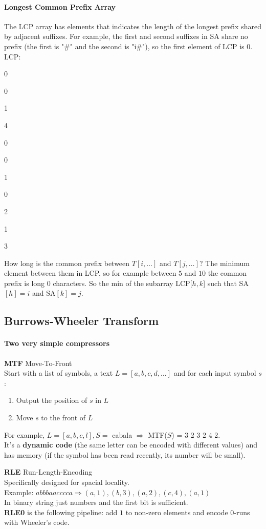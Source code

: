 \documentclass[10pt]{report}
\begin{document}
\paragraph{Longest Common Prefix Array} The LCP array has elements that indicates the length of the longest prefix shared by adjacent suffixes. For example, the first and second suffixes in SA share no prefix (the first is "\#" and the second is "i\#"), so the first element of LCP is 0. LCP:
\begin{list}{}{}
	\item 0
	\item 0
	\item 1
	\item 4
	\item 0
	\item 0
	\item 1
	\item 0
	\item 2
	\item 1
	\item 3
\end{list}
How long is the common prefix between $T[i,\ldots]$ and $T[j,\ldots]$? The minimum element between them in LCP, so for example between $5$ and $10$ the common prefix is long $0$ characters. So the min of the subarray LCP[$h,k$] such that SA$[h]=i$ and SA$[k]=j$.
\subsection{Burrows-Wheeler Transform}
\paragraph{Two very simple compressors}
\begin{list}{}{}
	\item \textbf{MTF} Move-To-Front\\
	Start with a list of symbols, a text $L=[a,b,c,d,\ldots]$ and for each input symbol $s$:
	\begin{enumerate}
		\item Output the position of $s$ in $L$
		\item Move $s$ to the front of $L$
	\end{enumerate}
	For example, $L=[a,b,c,l], S =$ cabala $\Rightarrow$ MTF($S$) = 3 2 3 2 4 2.\\
	It's a \textbf{dynamic code} (the same letter can be encoded with different values) and has memory (if the symbol has been read recently, its number will be small).
	\item \textbf{RLE} Run-Length-Encoding\\
	Specifically designed for spacial locality.\\
	Example: $abbbaacccca \Rightarrow (a,1),(b,3),(a,2),(c,4),(a,1)$\\
	In binary string just numbers and the first bit is sufficient.\\
	\textbf{RLE0} is the following pipeline: add $1$ to non-zero elements and encode 0-runs with Wheeler's code.
\end{list}
\end{document}
